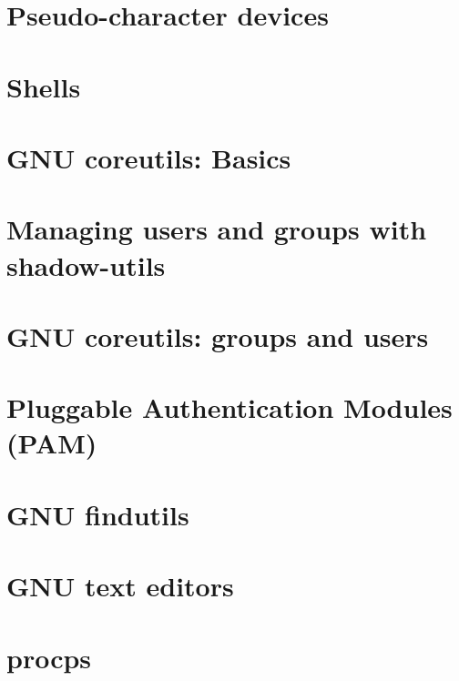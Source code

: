 \documentclass[oneside]{book}
\begin{document}
\part{Pseudo-character devices}



\part{Shells}





\part{GNU coreutils: Basics}















\part{Managing users and groups with shadow-utils}






\part{GNU coreutils: groups and users}


\part{Pluggable Authentication Modules (PAM)}


\part{GNU findutils}


\part{GNU text editors}



\part{procps}

\end{document}
